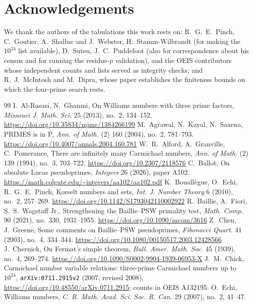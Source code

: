 \documentclass[11pt]{amsart}
\theoremstyle{definition}
\theoremstyle{remark}
\begin{document}
\section*{Acknowledgements}
We thank the authors of the tabulations this work rests on: R.~G.~E.~Pinch, C.~Goutier, A.~Shallue and J.~Webster, H.~Stamm-Wilbrandt (for making the $10^{24}$ list available), D.~Suteu, J.~C.~Puddefoot (also for correspondence about his census and for running the residue-$p$ validation), and the OEIS contributors whose independent counts and lists served as integrity checks; and R.~J.~McIntosh and M.~Dipra, whose paper establishes the finiteness bounds on which the four-prime search rests.

\begin{thebibliography}{99}
 I.~Al-Rasasi, N.~Ghanmi, On Williams numbers with three prime factors, \emph{Missouri J. Math. Sci.} 25 (2013), no.~2, 134--152. \url{https://doi.org/10.35834/mjms/1384266199}
 M.~Agrawal, N.~Kayal, N.~Saxena, PRIMES is in P, \emph{Ann. of Math.} (2) 160 (2004), no.~2, 781--793. \url{https://doi.org/10.4007/annals.2004.160.781}
 W.~R.~Alford, A.~Granville, C.~Pomerance, There are infinitely many Carmichael numbers, \emph{Ann. of Math.} (2) 139 (1994), no.~3, 703--722. \url{https://doi.org/10.2307/2118576}
 C.~Ballot, On absolute Lucas pseudoprimes, \emph{Integers} 26 (2026), paper A102. \url{https://math.colgate.edu/~integers/aa102/aa102.pdf}
 K.~Bouall\`egue, O.~Echi, R.~G.~E.~Pinch, Korselt numbers and sets, \emph{Int. J. Number Theory} 6 (2010), no.~2, 257--269. \url{https://doi.org/10.1142/S1793042110002922}
 R.~Baillie, A.~Fiori, S.~S.~Wagstaff Jr., Strengthening the Baillie--PSW primality test, \emph{Math. Comp.} 90 (2021), no.~330, 1931--1955. \url{https://doi.org/10.1090/mcom/3616}
 Z.~Chen, J.~Greene, Some comments on Baillie--PSW pseudoprimes, \emph{Fibonacci Quart.} 41 (2003), no.~4, 334--344. \url{https://doi.org/10.1080/00150517.2003.12428566}
 J.~Chernick, On Fermat's simple theorem, \emph{Bull. Amer. Math. Soc.} 45 (1939), no.~4, 269--274. \url{https://doi.org/10.1090/S0002-9904-1939-06953-X}
 J.~M.~Chick, Carmichael number variable relations: three-prime Carmichael numbers up to $10^{24}$, \texttt{arXiv:0711.2915v2} (2007; revised 2008), \url{https://doi.org/10.48550/arXiv.0711.2915}; counts in OEIS A132195.
 O.~Echi, Williams numbers, \emph{C. R. Math. Acad. Sci. Soc. R. Can.} 29 (2007), no.~2, 41--47.

\end{thebibliography}
\end{document}
